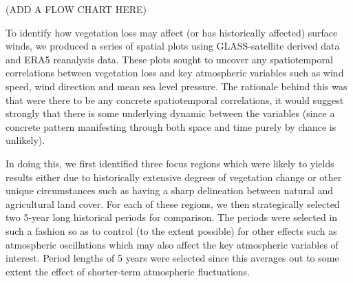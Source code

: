 %
%
%
%
%

(ADD A FLOW CHART HERE)

To identify how vegetation loss may affect (or has historically affected) surface winds, we produced a series of spatial plots using GLASS-satellite derived data and ERA5 reanalysis data. These plots sought to uncover any spatiotemporal correlations between vegetation loss and key atmospheric variables such as wind speed, wind direction and mean sea level pressure. The rationale behind this was that were there to be any concrete spatiotemporal correlations, it would suggest strongly that there is some underlying dynamic between the variables (since a concrete pattern manifesting through both space and time purely by chance is unlikely).

In doing this, we first identified three focus regions which were likely to yields results either due to historically extensive degrees of vegetation change or other unique circumstances such as having a sharp delineation between natural and agricultural land cover. For each of these regions, we then strategically selected two 5-year long historical periods for comparison. The periods were selected in such a fashion so as to control (to the extent possible) for other effects such as atmospheric oscillations which may also affect the key atmospheric variables of interest. Period lengths of 5 years were selected since this averages out to some extent the effect of shorter-term atmospheric fluctuations.

